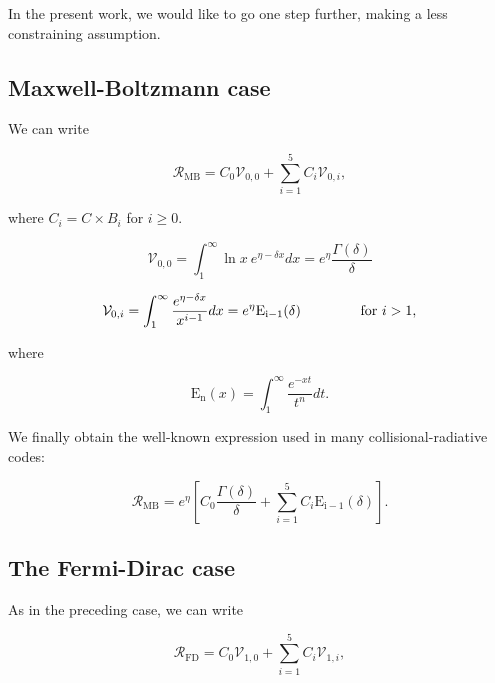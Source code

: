 \documentclass[a4paper,10pt]{article}
\begin{document}
\noindent In the present work, we would like to go one step further, making a less constraining assumption.

\subsection{Maxwell-Boltzmann case}\label{subsec52}

We can write

\begin{equation*}
\mathcal{R}_{\mathrm{MB}}=C_0\mathcal{V}_{0,0}+\sum_{i=1}^5C_i\mathcal{V}_{0,i},
\end{equation*}

\noindent where $C_i=C\times B_i$ for $i\ge 0$.

\begin{equation*}
\mathcal{V}_{0,0}=\int_1^{\infty}\ln x~e^{\eta-\delta x}dx=e^{\eta}\frac{\Gamma(\delta)}{\delta}
\end{equation*}

\begin{equation*}
\mathcal{V}_{0,i}=\int_1^{\infty}\frac{e^{\eta-\delta x}}{x^{i-1}}dx=e^{\eta}\mathrm{E_{i-1}}(\delta)\hspace{1.5cm}{\rm for}\ i>1,
\end{equation*}

\noindent where

\begin{equation*}
\mathrm{E_n}(x)=\int_1^{\infty}\frac{e^{-xt}}{t^n}dt.
\end{equation*}

\noindent We finally obtain the well-known expression used in many collisional-radiative codes:

\begin{equation}\label{rmb}
\mathcal{R}_{\mathrm{MB}}=e^{\eta}\left[C_0\frac{\Gamma(\delta)}{\delta}+\sum_{i=1}^5C_i\mathrm{E_{i-1}}(\delta)\right].
\end{equation}

\subsection{The Fermi-Dirac case}\label{subsec53}

As in the preceding case, we can write

\begin{equation*}
\mathcal{R}_{\mathrm{FD}}=C_0\mathcal{V}_{1,0}+\sum_{i=1}^5C_i\mathcal{V}_{1,i},
\end{equation*}
\end{document}
